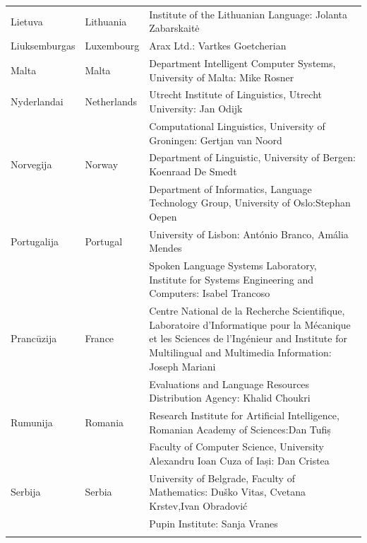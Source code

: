 \begin{longtable}{llp{113mm}}
  Lietuva & \textcolor{grey1}{Lithuania} & Institute of the Lithuanian Language: Jolanta Zabarskaitė\\ \addlinespace
  
  Liuksemburgas & \textcolor{grey1}{Luxembourg} & Arax Ltd.: Vartkes Goetcherian\\ \addlinespace
  
  Malta & \textcolor{grey1}{Malta} & Department Intelligent Computer Systems, University of Malta: Mike Rosner\\ \addlinespace
  
  Nyderlandai & \textcolor{grey1}{Netherlands} & Utrecht Institute of Linguistics, Utrecht University: Jan Odijk\\ \addlinespace 
  & & Computational Linguistics, University of Groningen: Gertjan van Noord\\ \addlinespace
  
  Norvegija & \textcolor{grey1}{Norway} & Department of Linguistic, University of Bergen: Koenraad De Smedt\\ \addlinespace 
  & & Department of Informatics, Language Technology Group, University of Oslo:\newline Stephan Oepen \\ \addlinespace
  
  Portugalija & \textcolor{grey1}{Portugal} & University of Lisbon: António Branco, Amália Mendes \\ \addlinespace
  & & Spoken Language Systems Laboratory, Institute for Systems Engineering and Computers: Isabel Trancoso \\ \addlinespace
  
  Prancūzija & \textcolor{grey1}{France} & Centre National de la Recherche Scientifique, Laboratoire d'Informatique pour la Mécanique et les Sciences de l'Ingénieur and Institute for Multilingual and Multimedia Information: Joseph Mariani \\ \addlinespace
  & & Evaluations and Language Resources Distribution Agency: Khalid Choukri\\ \addlinespace
   
  Rumunija & \textcolor{grey1}{Romania} & Research Institute for Artificial Intelligence, Romanian Academy of Sciences:\newline Dan Tufiș \\ \addlinespace
  & & Faculty of Computer Science, University Alexandru Ioan Cuza of Iași: Dan Cristea \\ \addlinespace
  
  Serbija & \textcolor{grey1}{Serbia} & University of Belgrade, Faculty of Mathematics: Duško Vitas, Cvetana Krstev,\newline Ivan Obradović \\ \addlinespace
  & & Pupin Institute: Sanja Vranes \\ \addlinespace
    

\end{longtable}
